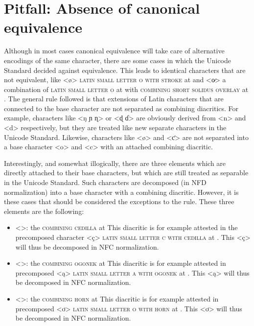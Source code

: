 \section{Pitfall: Absence of canonical equivalence}
\label{pitfall-absence-of-equivalence}

Although in most cases canonical equivalence will take care of alternative
encodings of the same character, there are some cases in which the Unicode
Standard decided against equivalence. This leads to identical characters that
are not equivalent, like <ø> \textsc{latin small letter o with stroke} at
 and <o̷> a combination of \textsc{latin small letter o} at 
with \textsc{combining short solidus overlay} at .
The general rule followed is that extensions of Latin characters that are
connected to the base character are not separated as combining diacritics. For
example, characters like <ŋ ɲ ɳ> or <ɖ ɗ> are obviously derived from <n> and <d>
respectively, but they are treated like new separate characters in the Unicode
Standard. Likewise, characters like <ø> and <ƈ> are not separated into a base 
character <o> and <c> with an attached combining diacritic.

Interestingly, and somewhat illogically, there are three elements which are
directly attached to their base characters, but which are still treated as
separable in the Unicode Standard. Such characters are decomposed (in NFD
normalization) into a base character with a combining diacritic. However, it is
these cases that should be considered the exceptions to the rule. These three 
elements are the following:

\begin{itemize}

  \item <>: the \textsc{combining cedilla} at  \newline 
        This diacritic is
        for example attested in the precomposed character <ç> \textsc{latin
        small letter c with cedilla} at . This <ç> will thus be
        decomposed in NFC normalization.
  \item <>: the \textsc{combining ogonek} at  \newline 
        This diacritic is
        for example attested in precomposed <ą> \textsc{latin small letter a
        with ogonek} at . This <ą> will thus be decomposed in NFC
        normalization.
  \item <>: the \textsc{combining horn} at  \newline 
        This diacritic is for
        example attested in precomposed <ơ> \textsc{latin small letter o with
        horn} at . This <ơ> will thus be decomposed in NFC
        normalization. 

\end{itemize}

